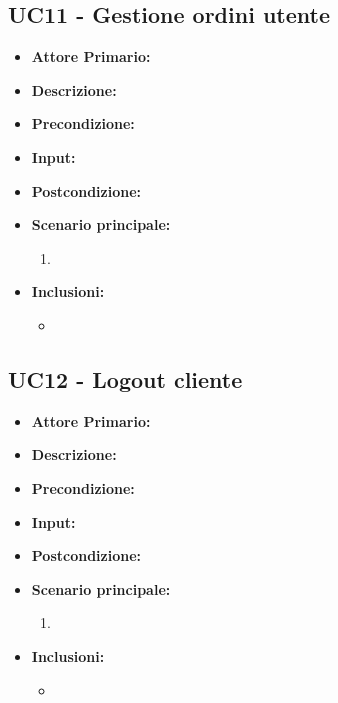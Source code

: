 \subsection{UC11 - Gestione ordini utente}
\label{UC11}
\begin{itemize}
    \item \textbf{Attore Primario:} 
    \item \textbf{Descrizione:}
    \item \textbf{Precondizione:}
    \item \textbf{Input:}
    \item \textbf{Postcondizione:}
    \item \textbf{Scenario principale:}
    \begin{enumerate}
        \item 
    \end{enumerate}
    \item \textbf{Inclusioni:}
    \begin{itemize}
        \item
    \end{itemize}
\end{itemize}

\subsection{UC12 - Logout cliente}
\label{UC12}
\begin{itemize}
    \item \textbf{Attore Primario:} 
    \item \textbf{Descrizione:}
    \item \textbf{Precondizione:}
    \item \textbf{Input:}
    \item \textbf{Postcondizione:}
    \item \textbf{Scenario principale:}
    \begin{enumerate}
        \item 
    \end{enumerate}
    \item \textbf{Inclusioni:}
    \begin{itemize}
        \item
    \end{itemize}
\end{itemize}